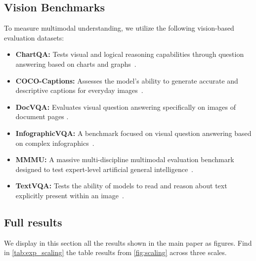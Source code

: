 \documentclass[11pt, a4paper, twocolumn, copyright, google]{google}
\begin{document}
\subsection{Vision Benchmarks}
To measure multimodal understanding, we utilize the following vision-based evaluation datasets:
\begin{itemize}
    \item \textbf{ChartQA:} Tests visual and logical reasoning capabilities through question answering based on charts and graphs~\citep{masry-etal-2022-chartqa}.
    \item \textbf{COCO-Captions:} Assesses the model's ability to generate accurate and descriptive captions for everyday images~\citep{chen2015microsoft}.
    \item \textbf{DocVQA:} Evaluates visual question answering specifically on images of document pages \citep{mathew2021docvqa}.
    \item \textbf{InfographicVQA:} A benchmark focused on visual question answering based on complex infographics~\citep{mathew2022infographicvqa}.
    \item \textbf{MMMU:} A massive multi-discipline multimodal evaluation benchmark designed to test expert-level artificial general intelligence~\citep{yue2024mmmu}.
    \item \textbf{TextVQA:} Tests the ability of models to read and reason about text explicitly present within an image~\citep{singh2019towards}.
\end{itemize}

\subsection{Full results}

We display in this section all the results shown in the main paper as figures. Find in \autoref{tab:exp_scaling} the table results from \autoref{fig:scaling} across three scales.
\end{document}
